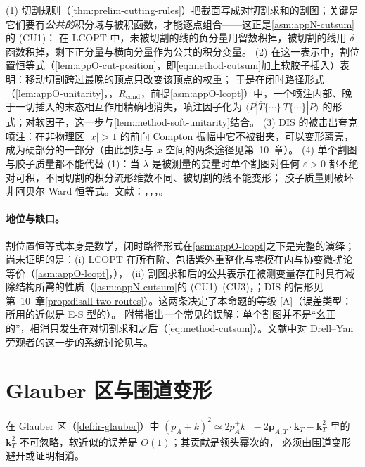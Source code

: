 \begin{proofsketch}
(1) 切割规则（\cref{thm:prelim-cutting-rules}）把截面写成对切割求和的割图；关键是它们要有\emph{公共的}积分域与被积函数，才能逐点组合——这正是\cref{asm:appN-cutsum}的 (CU1)：
在 LCOPT 中，未被切割的线的负分量用留数积掉，被切割的线用 $\delta$ 函数积掉，剩下正分量与横向分量作为公共的积分变量。
(2) 在这一表示中，割位置恒等式（\cref{lem:appO-cut-position}，即\cref{eq:method-cutsum}加上软胶子插入）表明：移动切割跨过最晚的顶点只改变该顶点的权重；
于是在闭时路径形式（\cref{lem:appO-unitarity}，\tagR，$R_{\mathrm{cond}}$，前提\cref{asm:appO-lcopt}）中，一个喷注内部、晚于一切插入的末态相互作用精确地消失，喷注因子化为
$\langle P|\bar T\{\cdots\}\,T\{\cdots\}|P\rangle$ 的形式；对软因子，这一步与\cref{lem:method-soft-unitarity}结合。
(3) DIS 的被击出夸克喷注：在非物理区 $|x|>1$ 的前向 Compton 振幅中它不被钳夹，可以变形离壳，成为硬部分的一部分（由此到矩与 $x$ 空间的两条途径见第~10~章）。
(4) 单个割图与胶子质量都不能代替 (1)：当 $\lambda$ 是被测量的变量时单个割图对任何 $\varepsilon>0$ 都不绝对可积，不同切割的积分流形维数不同、被切割的线不能变形；
胶子质量则破坏非阿贝尔 Ward 恒等式。文献：\cite{LibbySterman1978a}，\cite{CollinsSoperSterman1988}，\cite[第~14.4~节]{Collins2011}，\cite{AybatSterman2009}。
\end{proofsketch}

\paragraph{地位与缺口。}割位置恒等式本身是数学，闭时路径形式在\cref{asm:appO-lcopt}之下是完整的演绎；尚未证明的是：(i) LCOPT 在所有阶、包括紫外重整化与零模在内与协变微扰论等价（\cref{asm:appO-lcopt}，\tagA），
(ii) 割图求和后的公共表示在被测变量存在时具有减除结构所需的性质（\cref{asm:appN-cutsum}的 (CU1)--(CU3)，\tagA；DIS 的情形见第~10~章\cref{prop:disall-two-routes}）。这两条决定了本命题的等级 [A]（误差类型：所用的近似是 E-S 型的）。
附带指出一个常见的误解：单个割图并不是“幺正的”，相消只发生在对切割求和之后（\cref{eq:method-cutsum}）。文献中对 Drell--Yan 旁观者的这一步的系统讨论见\cite{CollinsSoperSterman1988}与\cite[第~14.4~节]{Collins2011}。

\section{Glauber 区与围道变形}\label{sec:method-glauber}

在 Glauber 区（\cref{def:ir-glauber}）中 $(p_A+k)^2\simeq2p_A^+k^--2\mathbf p_{A,T}\cdot\mathbf k_T-\mathbf k_T^2$ 里的 $\mathbf k_T^2$ 不可忽略，软近似的误差是 $O(1)$；其贡献是领头幂次的，
必须由围道变形避开或证明相消。

